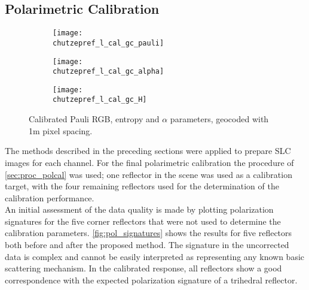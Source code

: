 \subsection{Polarimetric Calibration}\label{sec:res_polcal}
\begin{figure*}[ht]
	\begin{subfigure}[t]{2\columnwidth}
		\texttt{[image: \\chutzepref\_l\_cal\_gc\_pauli]}
		\label{fig:gc:pauli_rgb}
	\end{subfigure}
	\begin{subfigure}[t]{\columnwidth}
		\texttt{[image: \\chutzepref\_l\_cal\_gc\_alpha]}
		\label{fig:gc:alpha}
	\end{subfigure}
	\begin{subfigure}[t]{\columnwidth}
		\texttt{[image: \\chutzepref\_l\_cal\_gc\_H]}
		\label{fig:gc:H}
	\end{subfigure}
	\caption{Calibrated Pauli RGB, entropy and $\alpha$ parameters, geocoded with 1m pixel spacing.}
	\label{fig:gc}
\end{figure*}
The methods described in the preceding sections were applied to prepare SLC images for each channel. For the final polarimetric calibration the procedure of \autoref{sec:proc_polcal} was used; one reflector in the scene was used as a calibration target, with the four remaining reflectors used for the determination of the calibration performance.\\
An initial assessment of the data quality is made by plotting polarization signatures\cite{VanZyl1987} for the  five corner reflectors that were not used to determine the calibration parameters. \autoref{fig:pol_signatures} shows the results for five reflectors both before and after the proposed method.
The signature in the uncorrected data is complex and cannot be easily interpreted as representing any known basic scattering mechanism. In the calibrated response, all reflectors show a good correspondence with the expected polarization signature of a trihedral reflector.\\
